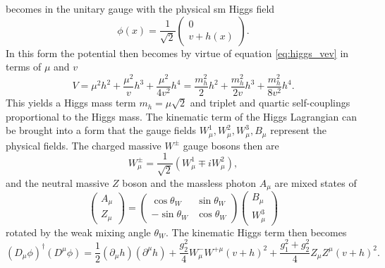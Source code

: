 becomes in the unitary gauge with the physical \ac{sm} Higgs field
\begin{equation}
    \phi(x)=\frac{1}{\sqrt{2}}
    \begin{pmatrix}
        0 \\
        v+h(x)
    \end{pmatrix}.
    \label{eq:unitary_gauge}
\end{equation}
In this form the potential then becomes by virtue of equation \ref{eq:higgs_vev} in terms of $\mu$ and $v$
\begin{equation}
    V=\mu^2h^2+\frac{\mu^2}{v}h^3+\frac{\mu^2}{4v^2}h^4
    =
    \frac{m_h^2}{2}h^2+\frac{m_h^2}{2v}h^3+\frac{m_h^2}{8v^2}h^4.
    \label{eq:higgs_potential}
\end{equation}
This yields a Higgs mass term $m_h=\mu\sqrt{2}$ and triplet and quartic self-couplings proportional to the Higgs mass. The kinematic term of the Higgs Lagrangian can be brought into a form that the gauge fields $W^1_\mu,W^2_\mu,W^3_\mu,B_\mu$ represent the physical fields. The charged massive $W^{\pm}$ gauge bosons then are
\begin{equation}
    W_\mu^\pm = \frac{1}{\sqrt{2}}(W_\mu^1\mp i W_\mu^2),
\end{equation}
and the neutral massive $Z$ boson and the massless photon $A_\mu$ are mixed states of
\begin{equation}
    \begin{pmatrix}
        A_\mu \\
        Z_\mu
    \end{pmatrix}
    =
    \begin{pmatrix}
        \cos\theta_W  & \sin\theta_W \\
        -\sin\theta_W & \cos\theta_W
    \end{pmatrix}
    \begin{pmatrix}
        B_\mu \\
        W^3_\mu
    \end{pmatrix}
\end{equation}
rotated by the weak mixing angle $\theta_W$. The kinematic Higgs term then becomes
\begin{equation}
    \left(D_\mu\phi\right)^\dagger (D^\mu\phi )=
    \frac{1}{2}(\partial_\mu h)(\partial^\mu h)+
    \frac{g_2^2}{4}W^-_\mu W^{+\mu}(v+h)^2+
    \frac{g_1^2+g_2^2}{4} Z_\mu Z^\mu(v+h)^2.
\end{equation}

